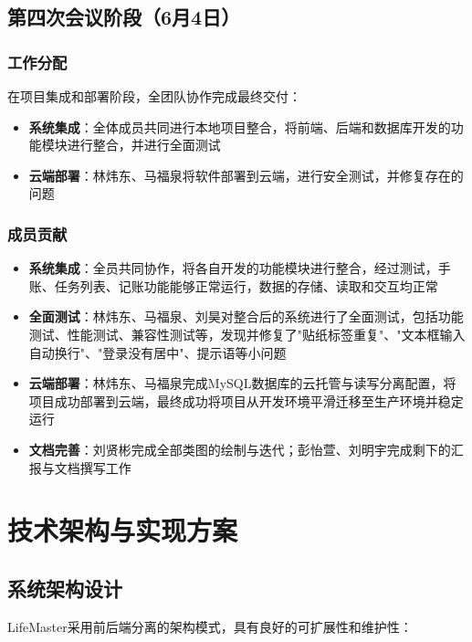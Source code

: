 \documentclass[a4paper]{article}
\begin{document}
\subsection{第四次会议阶段（6月4日）}

\subsubsection{工作分配}

在项目集成和部署阶段，全团队协作完成最终交付：

\begin{itemize}
    \item \textbf{系统集成}：全体成员共同进行本地项目整合，将前端、后端和数据库开发的功能模块进行整合，并进行全面测试
    \item \textbf{云端部署}：林炜东、马福泉将软件部署到云端，进行安全测试，并修复存在的问题
\end{itemize}

\subsubsection{成员贡献}

\begin{itemize}
    \item \textbf{系统集成}：全员共同协作，将各自开发的功能模块进行整合，经过测试，手账、任务列表、记账功能能够正常运行，数据的存储、读取和交互均正常
    \item \textbf{全面测试}：林炜东、马福泉、刘昊对整合后的系统进行了全面测试，包括功能测试、性能测试、兼容性测试等，发现并修复了"贴纸标签重复"、"文本框输入自动换行"、"登录没有居中"、提示语等小问题
    \item \textbf{云端部署}：林炜东、马福泉完成MySQL数据库的云托管与读写分离配置，将项目成功部署到云端，最终成功将项目从开发环境平滑迁移至生产环境并稳定运行
    \item \textbf{文档完善}：刘贤彬完成全部类图的绘制与迭代；彭怡萱、刘明宇完成剩下的汇报与文档撰写工作
\end{itemize}

\section{技术架构与实现方案}

\subsection{系统架构设计}

LifeMaster采用前后端分离的架构模式，具有良好的可扩展性和维护性：
\end{document}
